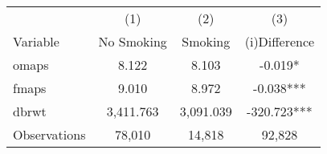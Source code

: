 \begin{tabular}{l*{3}c}
\hline\hline
 & (1) & (2) & (3) \\
Variable & No Smoking & Smoking & (i)Difference \\
\hline
omaps&8.122&8.103&-0.019*\\
fmaps&9.010&8.972&-0.038***\\
dbrwt&3,411.763&3,091.039&-320.723***\\
\hline
Observations & 78,010 & 14,818 & 92,828 \\
\hline\hline
\end{tabular}
